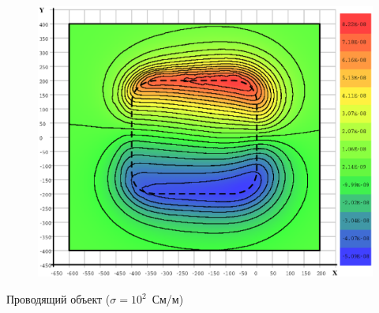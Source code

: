 \documentclass[aspectratio=43]{beamer}
\begin{document}
\begin{frame}
\begin{columns}[t,totalwidth=\linewidth]
\begin{column}{.5\linewidth}
			\vspace{-2.75em}
			\begin{figure}[H]
				\includegraphics[width=1.1\textwidth,height=1.1\textheight,keepaspectratio]{200_yes_z=-601_EzR.eps}
			\end{figure}
			\begin{center}
				\vspace{-1em}
				\tiny{Проводящий объект ($\sigma = 10^{2}$~См/м)}
			\end{center}
		\end{column}
	\end{columns}
\end{frame}

\end{document}
